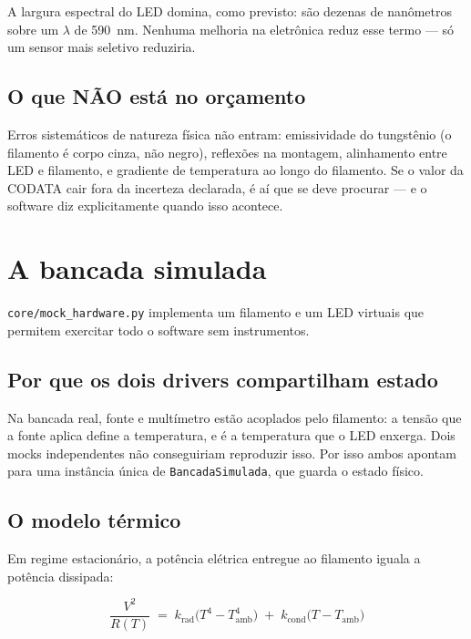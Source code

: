 \documentclass[11pt,a4paper]{article}
\newcommand{\arqv}[1]{\texttt{#1}}
\newcommand{\classe}[1]{\texttt{#1}}
\begin{document}
A largura espectral do LED domina, como previsto: são dezenas de nanômetros
sobre um $\lambda$ de 590~nm. Nenhuma melhoria na eletrônica reduz esse termo
--- só um sensor mais seletivo reduziria.

\subsection{O que NÃO está no orçamento}

Erros sistemáticos de natureza física não entram: emissividade do tungstênio
(o filamento é corpo cinza, não negro), reflexões na montagem, alinhamento
entre LED e filamento, e gradiente de temperatura ao longo do filamento. Se o
valor da CODATA cair fora da incerteza declarada, é aí que se deve procurar ---
e o software diz explicitamente quando isso acontece.

\section{A bancada simulada}
\label{sec:mock}

\arqv{core/mock\_hardware.py} implementa um filamento e um LED virtuais que
permitem exercitar todo o software sem instrumentos.

\subsection{Por que os dois drivers compartilham estado}

Na bancada real, fonte e multímetro estão acoplados pelo filamento: a tensão
que a fonte aplica define a temperatura, e é a temperatura que o LED enxerga.
Dois mocks independentes não conseguiriam reproduzir isso. Por isso ambos
apontam para uma instância única de \classe{BancadaSimulada}, que guarda o
estado físico.

\subsection{O modelo térmico}

Em regime estacionário, a potência elétrica entregue ao filamento iguala a
potência dissipada:

\begin{equation}
\frac{V^2}{R(T)} \;=\; k_{\text{rad}}\bigl(T^4 - T_{\text{amb}}^4\bigr)
\;+\; k_{\text{cond}}\bigl(T - T_{\text{amb}}\bigr)
\label{eq:balanco}
\end{equation}
\end{document}
